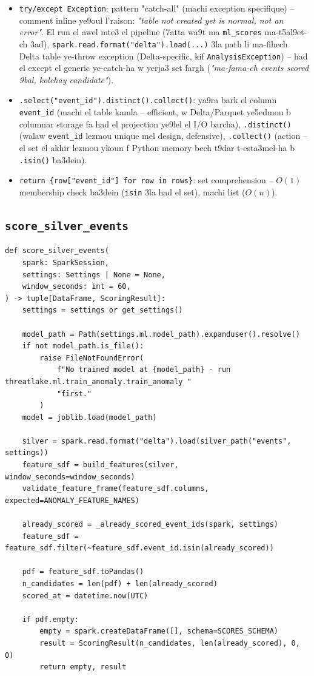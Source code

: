 \documentclass[11pt,a4paper]{report}
\DeclareRobustCommand{\code}[1]{\texttt{#1}}
\begin{document}
\begin{itemize}
  \item \code{try/except Exception}: pattern "catch-all" (machi exception
        specifique) -- comment inline ye9oul l'raison: \emph{"table not
        created yet is normal, not an error"}. El run el awel mte3 el
        pipeline (7atta wa9t ma \code{ml\_scores} ma-t5al9et-ch 3ad),
        \code{spark.read.format("delta").load(...)} 3la path li ma-fihech
        Delta table ye-throw exception (Delta-specific, kif
        \code{AnalysisException}) -- had el except el generic ye-catch-ha
        w yerja3 set fargh (\emph{"ma-fama-ch events scored 9bal, kolchay
        candidate"}).
  \item \code{.select("event\_id").distinct().collect()}: ya9ra bark el
        column \code{event\_id} (machi el table kamla -- efficient, w
        Delta/Parquet ye5edmou b columnar storage fa had el projection
        ye9lel el I/O barcha), \code{.distinct()} (walaw \code{event\_id}
        lezmou unique mel design, defensive), \code{.collect()} (action
        -- el set el akhir lezmou ykoun f Python memory bech t9dar
        t-esta3mel-ha b \code{.isin()} ba3dein).
  \item \code{return \{row["event\_id"] for row in rows\}}: set comprehension
        -- $O(1)$ membership check ba3dein (\code{isin} 3la had el set),
        machi list ($O(n)$).
\end{itemize}

\subsection{\code{score\_silver\_events}}

\begin{lstlisting}[style=pystyle]
def score_silver_events(
    spark: SparkSession,
    settings: Settings | None = None,
    window_seconds: int = 60,
) -> tuple[DataFrame, ScoringResult]:
    settings = settings or get_settings()

    model_path = Path(settings.ml.model_path).expanduser().resolve()
    if not model_path.is_file():
        raise FileNotFoundError(
            f"No trained model at {model_path} - run threatlake.ml.train_anomaly.train_anomaly "
            "first."
        )
    model = joblib.load(model_path)

    silver = spark.read.format("delta").load(silver_path("events", settings))
    feature_sdf = build_features(silver, window_seconds=window_seconds)
    validate_feature_frame(feature_sdf.columns, expected=ANOMALY_FEATURE_NAMES)

    already_scored = _already_scored_event_ids(spark, settings)
    feature_sdf = feature_sdf.filter(~feature_sdf.event_id.isin(already_scored))

    pdf = feature_sdf.toPandas()
    n_candidates = len(pdf) + len(already_scored)
    scored_at = datetime.now(UTC)

    if pdf.empty:
        empty = spark.createDataFrame([], schema=SCORES_SCHEMA)
        result = ScoringResult(n_candidates, len(already_scored), 0, 0)
        return empty, result
\end{lstlisting}
\end{document}
